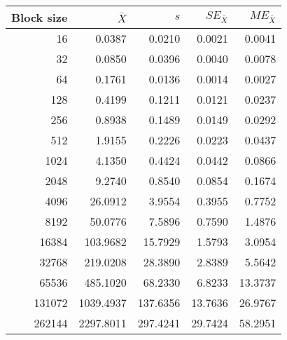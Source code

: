 \begin{tabular}{rrrrr}\toprule
{\small Block size} & $\bar{X}$ & $s$ & $SE_{\bar{X}}$ & $ME_{\bar{X}}$ \\\midrule
16 & 0.0387 & 0.0210 & 0.0021 & 0.0041\\
32 & 0.0850 & 0.0396 & 0.0040 & 0.0078\\
64 & 0.1761 & 0.0136 & 0.0014 & 0.0027\\
128 & 0.4199 & 0.1211 & 0.0121 & 0.0237\\
256 & 0.8938 & 0.1489 & 0.0149 & 0.0292\\
512 & 1.9155 & 0.2226 & 0.0223 & 0.0437\\
1024 & 4.1350 & 0.4424 & 0.0442 & 0.0866\\
2048 & 9.2740 & 0.8540 & 0.0854 & 0.1674\\
4096 & 26.0912 & 3.9554 & 0.3955 & 0.7752\\
8192 & 50.0776 & 7.5896 & 0.7590 & 1.4876\\
16384 & 103.9682 & 15.7929 & 1.5793 & 3.0954\\
32768 & 219.0208 & 28.3890 & 2.8389 & 5.5642\\
65536 & 485.1020 & 68.2330 & 6.8233 & 13.3737\\
131072 & 1039.4937 & 137.6356 & 13.7636 & 26.9767\\
262144 & 2297.8011 & 297.4241 & 29.7424 & 58.2951\\
\bottomrule
\end{tabular}
